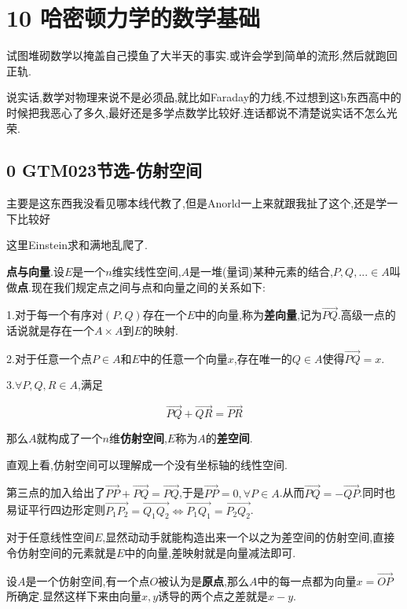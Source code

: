 \documentclass[UTF8]{article}
\begin{document}
	
	
	
\section*{10 哈密顿力学的数学基础}
	
	试图堆砌数学以掩盖自己摸鱼了大半天的事实.或许会学到简单的流形,然后就跑回正轨.
	
	说实话,数学对物理来说不是必须品,就比如Faraday的力线,不过想到这b东西高中的时候把我恶心了多久,最好还是多学点数学比较好.连话都说不清楚说实话不怎么光荣.
	
\subsection*{0 GTM023\cite{GTM023}节选-仿射空间}
	
	主要是这东西我没看见哪本线代教了,但是Anorld一上来就跟我扯了这个,还是学一下比较好
	
	这里Einstein求和满地乱爬了.
	
	\textbf{点与向量}.设$E$是一个$n$维实线性空间,$A$是一堆(量词)某种元素的结合,$P,Q,...\in A$叫做\textbf{点}.现在我们规定点之间与点和向量之间的关系如下:
	
	1.对于每一个有序对$(P,Q)$存在一个$E$中的向量,称为\textbf{差向量},记为$\overrightarrow{PQ}$.高级一点的话说就是存在一个$A\times A$到$E$的映射.
	
	2.对于任意一个点$P\in A$和$E$中的任意一个向量$x$,存在唯一的$Q\in A$使得$\overrightarrow{PQ}=x$.
	
	3.$\forall P,Q,R\in A$,满足
	
	\[\overrightarrow{PQ}+\overrightarrow{QR}=\overrightarrow{PR}\]
	
	那么$A$就构成了一个$n$维\textbf{仿射空间},$E$称为$A$的\textbf{差空间}.
	
	直观上看,仿射空间可以理解成一个没有坐标轴的线性空间.
	
	第三点的加入给出了$\overrightarrow{PP}+\overrightarrow{PQ}=\overrightarrow{PQ}$,于是$\overrightarrow{PP}=0,\forall P\in A$.从而$\overrightarrow{PQ}=-\overrightarrow{QP}$.同时也易证平行四边形定则$\overrightarrow{P_1P_2}=\overrightarrow{Q_1Q_2}\Leftrightarrow\overrightarrow{P_1Q_1}=\overrightarrow{P_2Q_2}$.
	
	对于任意线性空间$E$,显然动动手就能构造出来一个以之为差空间的仿射空间,直接令仿射空间的元素就是$E$中的向量,差映射就是向量减法即可.
	
	设$A$是一个仿射空间,有一个点$O$被认为是\textbf{原点},那么$A$中的每一点都为向量$x=\overrightarrow{OP}$所确定.显然这样下来由向量$x,y$诱导的两个点之差就是$x-y$.
	
\end{document}
